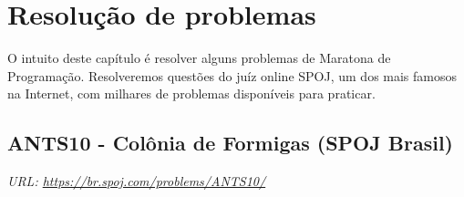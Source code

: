 \chapter{Resolução de problemas}
\label{cap:resolucao-problemas}

O intuito deste capítulo é resolver alguns problemas de Maratona de Programação. Resolveremos questões do juíz online SPOJ, um dos mais famosos na Internet, com milhares de problemas disponíveis para praticar.

\section{ANTS10 - Colônia de Formigas  (SPOJ Brasil)}

\textit{URL: \url{https://br.spoj.com/problems/ANTS10/}}

\vspace{0.3cm}

